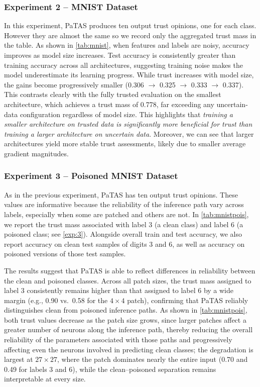 \subsubsection*{Experiment 2 -- MNIST Dataset}
In this experiment, PaTAS produces ten output trust opinions, one for each class. However they are almost the same so we record only the aggregated trust mass in the table. As shown in \cref{tab:mnist}, when features and labels are noisy, accuracy improves as model size increases. Test accuracy is consistently greater than training accuracy across all architectures, suggesting training noise makes the model underestimate its learning progress. While trust increases with model size, the gains become progressively smaller (0.306 $\to$ 0.325 $\to$ 0.333 $\to$ 0.337). This contrasts clearly with the fully trusted evaluation on the smallest architecture, which achieves a trust mass of 0.778, far exceeding any uncertain-data configuration regardless of model size. This highlights that \emph{training a smaller architecture on trusted data is significantly more beneficial for trust than training a larger architecture on uncertain data}. Moreover, we can see that larger architectures yield more stable trust assessments, likely due
to smaller average gradient magnitudes.


\subsubsection*{Experiment 3 – Poisoned MNIST Dataset}
As in the previous experiment, PaTAS has ten output trust opinions. These values are informative because the reliability of the inference path vary across labels, especially when some are patched and others are not. In \cref{tab:mnistpois}, we report the trust mass associated with label 3 (a clean class) and label 6 (a poisoned class; see \cref{exp:3}). Alongside overall train and test accuracy, we also report accuracy on clean test samples of digits 3 and 6, as well as accuracy on poisoned versions of those test samples.

The results suggest that PaTAS is able to reflect differences in reliability between the clean and poisoned classes. Across all patch sizes, the trust mass assigned to label 3 consistently remains higher than that assigned to label 6 by a wide margin (e.g., 0.90 vs.\ 0.58 for the $4\times4$ patch), confirming that PaTAS reliably distinguishes clean from poisoned inference paths. As shown in \cref{tab:mnistpois}, both trust values decrease as the patch size grows, since larger patches affect a greater number of neurons along the inference path, thereby reducing the overall reliability of the parameters associated with those paths and progressively affecting even the neurons involved in predicting clean classes; the degradation is largest at $27 \times 27$, where the patch dominates nearly the entire input (0.70 and 0.49 for labels 3 and 6), while the clean--poisoned separation remains interpretable at every size.

